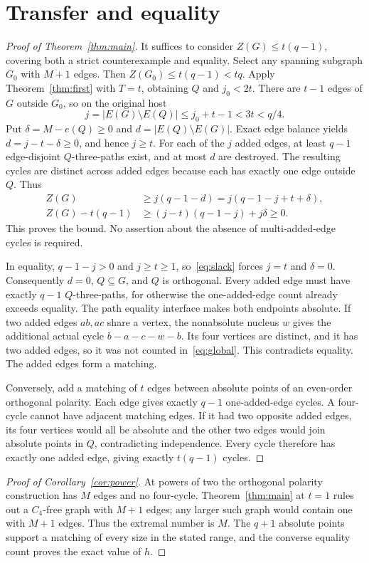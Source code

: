 \documentclass[11pt]{article}
\theoremstyle{remark}\newtheorem*{remark}{Remark}
\begin{document}
\section{Transfer and equality}\label{sec:transfer}
\begin{proof}[Proof of Theorem~\ref{thm:main}]
It suffices to consider $Z(G)\leq t(q-1)$, covering both a strict counterexample and equality. Select any spanning subgraph $G_0$ with $M+1$ edges. Then $Z(G_0)\leq t(q-1)<tq$. Apply Theorem~\ref{thm:first} with $T=t$, obtaining $Q$ and $j_0<2t$. There are $t-1$ edges of $G$ outside $G_0$, so on the original host
\[
 j=|E(G)\setminus E(Q)|\leq j_0+t-1<3t<q/4.
\]
Put $\delta=M-e(Q)\geq0$ and $d=|E(Q)\setminus E(G)|$. Exact edge balance yields $d=j-t-\delta\geq0$, and hence $j\geq t$.
For each of the $j$ added edges, at least $q-1$ edge-disjoint $Q$-three-paths exist, and at most $d$ are destroyed. The resulting cycles are distinct across added edges because each has exactly one edge outside $Q$. Thus
\begin{align}
 Z(G)&\geq j(q-1-d)=j(q-1-j+t+\delta),\label{eq:global}\\
 Z(G)-t(q-1)&\geq(j-t)(q-1-j)+j\delta\geq0.\label{eq:slack}
\end{align}
This proves the bound. No assertion about the absence of multi-added-edge cycles is required.

In equality, $q-1-j>0$ and $j\geq t\geq1$, so~\eqref{eq:slack} forces $j=t$ and $\delta=0$. Consequently $d=0$, $Q\subseteq G$, and $Q$ is orthogonal. Every added edge must have exactly $q-1$ $Q$-three-paths, for otherwise the one-added-edge count already exceeds equality. The path equality interface makes both endpoints absolute.
If two added edges $ab,ac$ share a vertex, the nonabsolute nucleus $w$ gives the additional actual cycle $b-a-c-w-b$. Its four vertices are distinct, and it has two added edges, so it was not counted in~\eqref{eq:global}. This contradicts equality. The added edges form a matching.

Conversely, add a matching of $t$ edges between absolute points of an even-order orthogonal polarity. Each edge gives exactly $q-1$ one-added-edge cycles. A four-cycle cannot have adjacent matching edges. If it had two opposite added edges, its four vertices would all be absolute and the other two edges would join absolute points in $Q$, contradicting independence. Every cycle therefore has exactly one added edge, giving exactly $t(q-1)$ cycles.
\end{proof}
\begin{proof}[Proof of Corollary~\ref{cor:power}]
At powers of two the orthogonal polarity construction has $M$ edges and no four-cycle. Theorem~\ref{thm:main} at $t=1$ rules out a $C_4$-free graph with $M+1$ edges; any larger such graph would contain one with $M+1$ edges. Thus the extremal number is $M$. The $q+1$ absolute points support a matching of every size in the stated range, and the converse equality count proves the exact value of $h$.
\end{proof}
\end{document}
